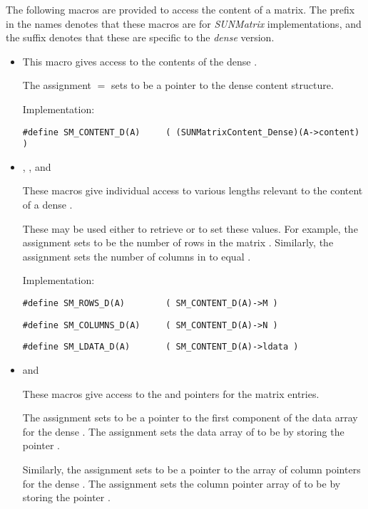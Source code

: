 The following macros are provided to access the
content of a {\sunmatdense} matrix. The prefix  in the names
denotes that these macros are for \emph{SUNMatrix} implementations,
and the suffix  denotes that these are specific to
the \emph{dense} version.
\begin{itemize}

\item {}

  This macro gives access to the contents of the
  dense .

  The assignment  $=$  sets
   to be a pointer to the dense  content
  structure.

  Implementation:

  \verb|#define SM_CONTENT_D(A)     ( (SUNMatrixContent_Dense)(A->content) )|

\item {}, , and 

  These macros give individual access to various lengths relevant to the
  content of a dense .

  These may be used either to retrieve or to set these values.  For
  example, the assignment  sets  to be
  the number of rows in the matrix .  Similarly, the
  assignment  sets the number of
  columns in  to equal .

  Implementation:

  \verb|#define SM_ROWS_D(A)        ( SM_CONTENT_D(A)->M )|

  \verb|#define SM_COLUMNS_D(A)     ( SM_CONTENT_D(A)->N )|

  \verb|#define SM_LDATA_D(A)       ( SM_CONTENT_D(A)->ldata )|

\item {} and 

  These macros give access to the  and  pointers for
  the matrix entries.

  The assignment  sets  to be
  a pointer to the first component of the data array for the dense
   .  The assignment 
  sets the data array of  to be  by storing the
  pointer .

  Similarly, the assignment  sets  to be
  a pointer to the array of column pointers for the dense  .
  The assignment  sets the column pointer
  array of  to be  by storing the pointer .


\end{itemize}
